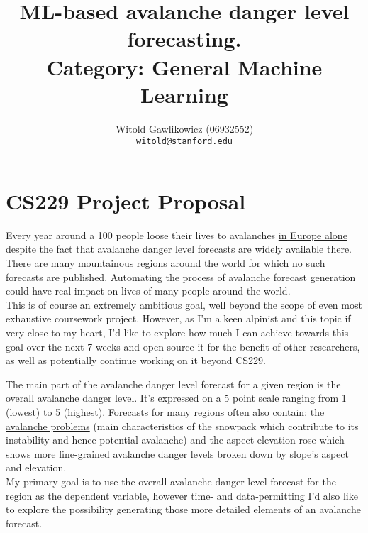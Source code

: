 \documentclass{article}
\title{ML-based avalanche danger level forecasting. \\ Category: General Machine Learning}
\author{
  Witold Gawlikowicz (06932552) \\
  \texttt{witold@stanford.edu}
}
\begin{document}
\maketitle



\section*{CS229 Project Proposal}

Every year around a 100 people loose their lives to avalanches \href{https://www.avalanches.org/fatalities/}{in Europe alone} despite the fact that avalanche danger level forecasts are widely available there. There are many mountainous regions around the world for which no such forecasts are published.
Automating the process of avalanche forecast generation could have real impact on lives of many people around the world. \\
This is of course an extremely ambitious goal, well beyond the scope of even most exhaustive coursework project. However, as I'm a keen alpinist and this topic if very close to my heart, I'd like to explore how much I can achieve towards this goal over the next 7 weeks and open-source it for the benefit of other researchers, as well as potentially continue working on it beyond CS229.

	The main part of the avalanche danger level forecast for a given region is the overall avalanche danger level. It's expressed on a 5 point scale ranging from 1 (lowest) to 5 (highest).	\href{https://www.shastaavalanche.org/page/how-read-advisory}{Forecasts} for many regions often also contain: \href{https://avalanche.state.co.us/forecasts/tutorial/avalanche-problems}{the avalanche problems} (main characteristics of the snowpack which contribute to its instability and hence potential avalanche) and the aspect-elevation rose which shows more fine-grained avalanche danger levels broken down by slope's aspect and elevation. \\
	My primary goal is to use the overall avalanche danger level forecast for the region as the dependent variable, however time- and data-permitting I'd also like to explore the possibility generating those more detailed elements of an avalanche forecast.	
	
\end{document}
